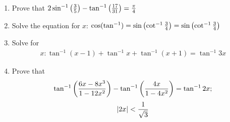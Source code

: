\begin{enumerate}
	\item Prove that $ 2\sin^{-1} \left(\frac{3}{5}\right) - \tan^{-1} \left(\frac{17}{31}\right) = \frac{\pi}{4}$

	\item Solve the equation for $x$: $\cos (\tan^{-1}) = \sin \left(\cot^{-1} \frac{3}{4}\right) = \sin \left(\cot^{-1} \frac{3}{4}\right)$

	
	\item Solve for 
	\begin{align*}
		x: \tan^{-1}(x-1) + \tan^{-1}x + \tan^{-1}(x+1) = \tan^{-1}3x
	\end{align*}

	\item Prove that 
	\begin{align*}
	\tan^{-1} \left(\frac{6x-8x^{3}}{1-12x^{2}}\right) - \tan^{-1} \left(\frac{4x}{1-4x^{2}}\right) = \tan^{-1}2x;
	\end{align*}
	\begin{align*}
		\left\vert2x\right\vert < \frac{1}{\sqrt{3}}
	\end{align*}

	
\end{enumerate}
